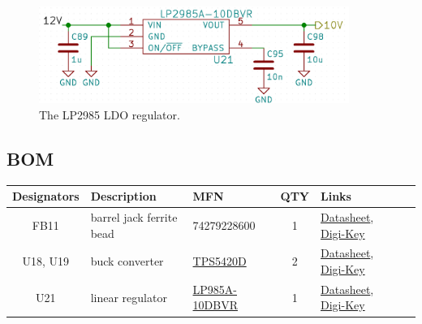 \begin{figure}[h]
        \centering
        \includegraphics[width=0.9\textwidth]{data/lp2985.png}
        \caption{The LP2985 LDO regulator.}
        \label{fig:lp2985}
\end{figure}

\subsection{BOM}
\label{sec:power-bom}

\label{tab:power-schematic-components}
\begin{tabularx}{\textwidth}{c l l c X>{\raggedright\arraybackslash}X}
        \toprule
        \textbf{Designators} & \textbf{Description} & \textbf{MFN} & \textbf{QTY} & \textbf{Links} \\
        \midrule \endhead FB11 & barrel jack ferrite bead & 74279228600 & 1 &
        \href{https://katalog.we-online.de/pbs/datasheet/74279228600.pdf}{Datasheet},
        \href{https://www.digikey.com/product-detail/en/wurth-electronics-inc/74279228600/732-6119-1-ND/5050874}{Digi-Key}
        \\
        U18, U19 & buck converter & \hyperlink{sec:tps5420d}{TPS5420D} & 2 &
        \href{http://www.ti.com/lit/ds/symlink/tps5420.pdf}{Datasheet},
        \href{https://www.digikey.com/product-detail/en/texas-instruments/TPS5420DR/296-31984-1-ND/3505318}{Digi-Key}
        \\
        U21 & linear regulator & \hyperlink{sec:lp985a-10dbvr}{LP985A-10DBVR} & 1 &
        \href{https://www.ti.com/lit/ds/symlink/lp2985.pdf}{Datasheet},
        \href{https://www.digikey.com/product-detail/en/texas-instruments/LP2985A-10DBVR/296-24264-1-ND/2038549}{Digi-Key}
        \\
        \bottomrule
\end{tabularx}
